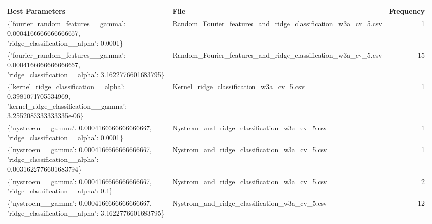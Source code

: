 \begin{tabularx}{\textwidth}{llr}
\toprule
                                                                                                         Best Parameters &                                                          File &  Frequency \\
\midrule
                        \{'fourier\_random\_features\_\_gamma': 0.0004166666666666667, 'ridge\_classification\_\_alpha': 0.0001\} & Random\_Fourier\_features\_and\_ridge\_classification\_w3a\_cv\_5.csv &          1 \\
            \{'fourier\_random\_features\_\_gamma': 0.0004166666666666667, 'ridge\_classification\_\_alpha': 3.1622776601683795\} & Random\_Fourier\_features\_and\_ridge\_classification\_w3a\_cv\_5.csv &         15 \\
\{'kernel\_ridge\_classification\_\_alpha': 0.3981071705534969, 'kernel\_ridge\_classification\_\_gamma': 3.2552083333333335e-06\} &                      Kernel\_ridge\_classification\_w3a\_cv\_5.csv &          1 \\
                                       \{'nystroem\_\_gamma': 0.0004166666666666667, 'ridge\_classification\_\_alpha': 0.0001\} &                 Nystrom\_and\_ridge\_classification\_w3a\_cv\_5.csv &          1 \\
                        \{'nystroem\_\_gamma': 0.0004166666666666667, 'ridge\_classification\_\_alpha': 0.0031622776601683794\} &                 Nystrom\_and\_ridge\_classification\_w3a\_cv\_5.csv &          1 \\
                                          \{'nystroem\_\_gamma': 0.0004166666666666667, 'ridge\_classification\_\_alpha': 0.1\} &                 Nystrom\_and\_ridge\_classification\_w3a\_cv\_5.csv &          2 \\
                           \{'nystroem\_\_gamma': 0.0004166666666666667, 'ridge\_classification\_\_alpha': 3.1622776601683795\} &                 Nystrom\_and\_ridge\_classification\_w3a\_cv\_5.csv &         12 \\
\bottomrule
\end{tabularx}
